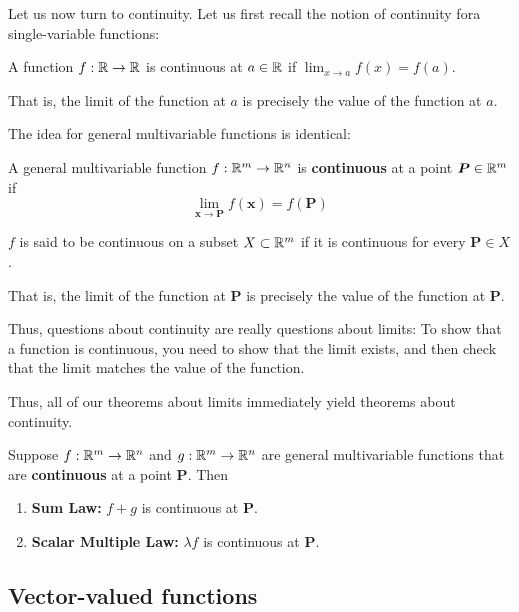 Let us now turn to continuity.  Let us first recall the notion of continuity fora single-variable functions:


\begin{definition}
    A function $f :\mathbb{R} \to \mathbb{R}$ is continuous at $a \in \mathbb{R}$ if $\lim_{x \to a}f(x) = f(a)$.
    
    \end{definition}

That is, the limit of the function at $a$ is precisely the value of the function at $a$.



The idea for general multivariable functions is identical:

\begin{definition}
    A general multivariable function $f: \mathbb{R}^m \to \mathbb{R}^n$ is \textbf{continuous} at a point $\bm{P} \in \mathbb{R}^m$ if 
    $$\lim_{\bm{x} \to \bm{P}} f(\bm{x}) = f(\bm{P})$$
    
    $f$ is said to be continuous on a subset $X \subset \mathbb{R}^m$ if it is continuous for every $\bm{P} \in X$.
    
    \end{definition}

That is, the limit of the function at $\bm{P}$ is precisely the value of the function at $\bm{P}$.

Thus, questions about continuity are really questions about limits:  To show that a function is continuous, you need to show that the limit exists, and then check that the limit matches the value of the function.

Thus, all of our theorems about limits immediately yield theorems about continuity.

\begin{theorem}
    Suppose $f: \mathbb{R}^m \to \mathbb{R}^n$ and $g: \mathbb{R}^m \to \mathbb{R}^n$ are general multivariable functions that are \textbf{continuous} at a point $\bm{P}$. Then
    
    \begin{enumerate}
        \item \textbf{Sum Law:} $f+g$ is continuous at $\bm{P}$.
        \item \textbf{Scalar Multiple Law:} $\lambda f$ is continuous at $\bm{P}$.

    \end{enumerate}
    
    
    \end{theorem}

\subsection{Vector-valued functions}

